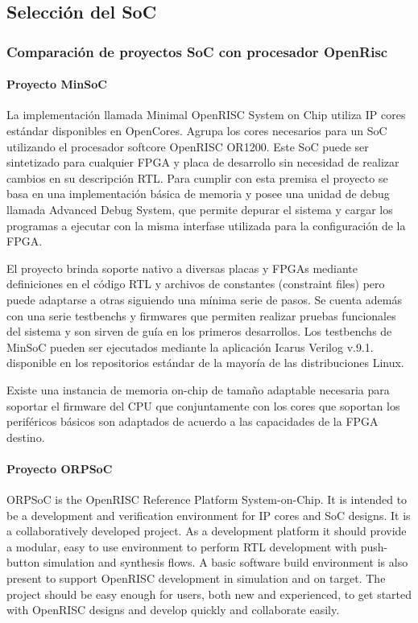  			\subsection{Selección del SoC}
				\subsubsection{Comparación de proyectos SoC con procesador OpenRisc} 
				
				\paragraph{Proyecto MinSoC}
				La implementación llamada Minimal OpenRISC System on Chip utiliza IP cores estándar disponibles en OpenCores. Agrupa los cores necesarios para un
				SoC utilizando el procesador softcore OpenRISC OR1200. Este SoC puede ser sintetizado para cualquier FPGA y placa de desarrollo sin necesidad de
				realizar cambios en su descripción RTL. Para cumplir con esta premisa el proyecto se basa en una implementación básica de memoria y posee una
				unidad de debug llamada Advanced Debug System, que permite depurar el sistema y cargar los programas a ejecutar con la misma interfase utilizada
				para la configuración de la FPGA.
				
				El proyecto brinda soporte nativo a diversas placas y FPGAs mediante definiciones en el código RTL y archivos de constantes (constraint files)
				pero puede adaptarse a otras siguiendo una mínima serie de pasos. Se cuenta además con una serie testbenchs y firmwares que permiten realizar
				pruebas funcionales del sistema y son sirven de guía en los primeros desarrollos. Los testbenchs de MinSoC pueden ser ejecutados mediante la
				aplicación Icarus Verilog v.9.1. disponible en los repositorios estándar de la mayoría de las distribuciones Linux. 
				
				Existe una instancia de memoria on-chip de tamaño adaptable necesaria para soportar el firmware del CPU que conjuntamente con los cores que
				soportan los periféricos básicos son adaptados de acuerdo a las capacidades de la FPGA destino. 
				
				\paragraph{Proyecto ORPSoC}
				ORPSoC is the OpenRISC Reference Platform System-on-Chip. It is intended to be a development and verification environment for IP cores and SoC
				designs. It is a collaboratively developed project.
                As a development platform it should provide a modular, easy to use environment to perform RTL development with push-button simulation
                and synthesis flows. A basic software build environment is also present to support OpenRISC development in simulation and on target.
                The project should be easy enough for users, both new and experienced, to get started with OpenRISC designs and develop quickly and
                collaborate easily.
				
